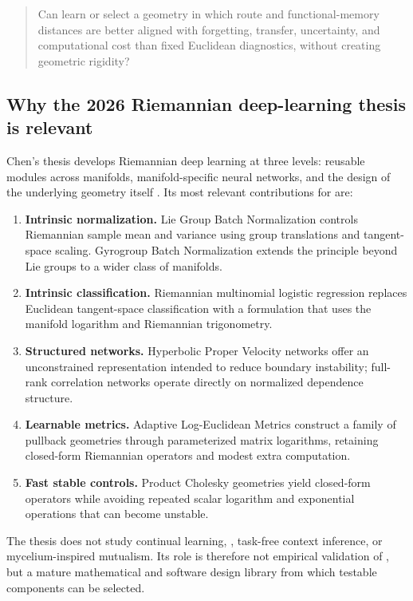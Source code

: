 \begin{quote}
Can \MMALS{} learn or select a geometry in which route and functional-memory distances are better aligned with forgetting, transfer, uncertainty, and computational cost than fixed Euclidean diagnostics, without creating geometric rigidity?
\end{quote}

\subsection{Why the 2026 Riemannian deep-learning thesis is relevant}
Chen's thesis develops Riemannian deep learning at three levels: reusable modules across manifolds, manifold-specific neural networks, and the design of the underlying geometry itself \citep{chen2026thesis}. Its most relevant contributions for \MMALS{} are:
\begin{enumerate}[leftmargin=1.7em]
  \item \textbf{Intrinsic normalization.} Lie Group Batch Normalization controls Riemannian sample mean and variance using group translations and tangent-space scaling. Gyrogroup Batch Normalization extends the principle beyond Lie groups to a wider class of manifolds.
  \item \textbf{Intrinsic classification.} Riemannian multinomial logistic regression replaces Euclidean tangent-space classification with a formulation that uses the manifold logarithm and Riemannian trigonometry.
  \item \textbf{Structured networks.} Hyperbolic Proper Velocity networks offer an unconstrained representation intended to reduce boundary instability; full-rank correlation networks operate directly on normalized dependence structure.
  \item \textbf{Learnable metrics.} Adaptive Log-Euclidean Metrics construct a family of pullback geometries through parameterized matrix logarithms, retaining closed-form Riemannian operators and modest extra computation.
  \item \textbf{Fast stable controls.} Product Cholesky geometries yield closed-form operators while avoiding repeated scalar logarithm and exponential operations that can become unstable.
\end{enumerate}

The thesis does not study continual learning, \MMALS{}, task-free context inference, or mycelium-inspired mutualism. Its role is therefore not empirical validation of \MMALS{}, but a mature mathematical and software design library from which testable components can be selected.

